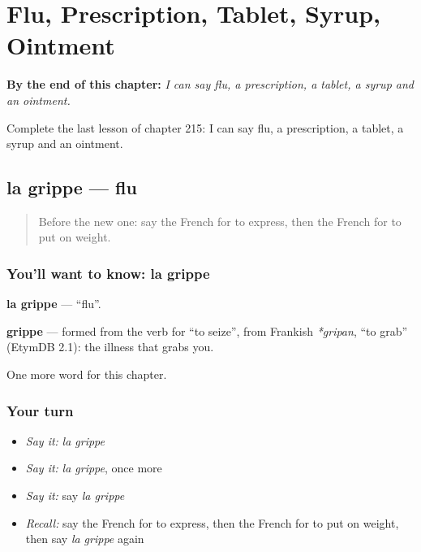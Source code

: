 
\chapter{Flu, Prescription, Tablet, Syrup, Ointment}
\label{ch:fr-flu-prescription-tablet-syrup-ointment}

\begin{chapteropening}
\textbf{By the end of this chapter:} \emph{I can say flu, a prescription, a tablet, a syrup and an ointment.}

Complete the last lesson of chapter 215: I can say flu, a prescription, a tablet, a syrup and an ointment.
\end{chapteropening}

\section[la grippe]{la grippe — flu}

\label{lesson:FR-C215-grippe}



\begin{quote}
Before the new one: say the French for to express, then the French for to put on weight.
\end{quote}

\subsection*{You'll want to know: la grippe}
\textbf{la grippe} — \textquotedblleft{}flu\textquotedblright{}.

\begin{cousinweb}
\textbf{grippe} — formed from the verb for \textquotedblleft{}to seize\textquotedblright{}, from Frankish \emph{*gripan}, \textquotedblleft{}to grab\textquotedblright{} (EtymDB 2.1): the illness that grabs you.
\end{cousinweb}

\begin{grammarlens}[title={What you've built}]
One more word for this chapter.
\end{grammarlens}

\subsection*{Your turn}
\begin{itemize}
\raggedright
  \item \emph{Say it:} \emph{la grippe}
  \item \emph{Say it:} \emph{la grippe}, once more
  \item \emph{Say it:} say \emph{la grippe}
  \item \emph{Recall:} say the French for to express, then the French for to put on weight, then say \emph{la grippe} again
\end{itemize}

